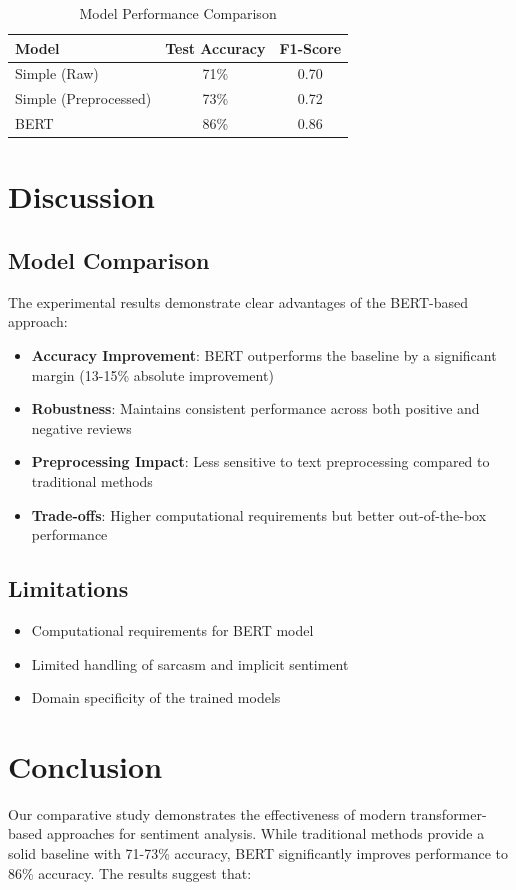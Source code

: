 \documentclass[numbers,nonatbib]{article}
\begin{document}
\begin{table}[h]
\caption{Model Performance Comparison}
\centering
\begin{tabular}{lcc}
\toprule
Model & Test Accuracy & F1-Score \\
\midrule
Simple (Raw) & 71\% & 0.70 \\
Simple (Preprocessed) & 73\% & 0.72 \\
BERT & 86\% & 0.86 \\
\bottomrule
\end{tabular}
\end{table}

\section{Discussion}
\subsection{Model Comparison}
The experimental results demonstrate clear advantages of the BERT-based approach:

\begin{itemize}
    \item \textbf{Accuracy Improvement}: BERT outperforms the baseline by a significant margin (13-15\% absolute improvement)
    \item \textbf{Robustness}: Maintains consistent performance across both positive and negative reviews
    \item \textbf{Preprocessing Impact}: Less sensitive to text preprocessing compared to traditional methods
    \item \textbf{Trade-offs}: Higher computational requirements but better out-of-the-box performance
\end{itemize}

\subsection{Limitations}
\begin{itemize}
    \item Computational requirements for BERT model
    \item Limited handling of sarcasm and implicit sentiment
    \item Domain specificity of the trained models
\end{itemize}

\section{Conclusion}
Our comparative study demonstrates the effectiveness of modern transformer-based approaches for sentiment analysis. While traditional methods provide a solid baseline with 71-73\% accuracy, BERT significantly improves performance to 86\% accuracy. The results suggest that:
\end{document}
